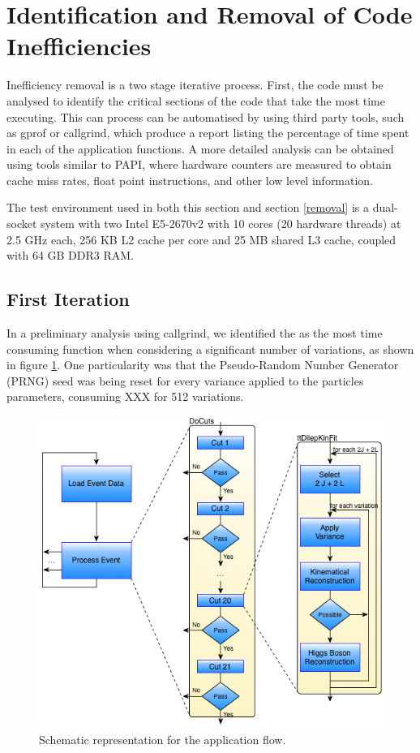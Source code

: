 \section{Identification and Removal of Code Inefficiencies}
\label{identification}

Inefficiency removal is a two stage iterative process. First, the code must be analysed to identify the critical sections of the code that take the most time executing. This can process can be automatised by using third party tools, such as gprof or callgrind, which produce a report listing the percentage of time spent in each of the application functions. A more detailed analysis can be obtained using tools similar to PAPI, where hardware counters are measured to obtain cache miss rates, float point instructions, and other low level information.

The test environment used in both this section and section \ref{removal} is a dual-socket system with two Intel E5-2670v2 with 10 cores (20 hardware threads) at 2.5 GHz each, 256 KB L2 cache per core and 25 MB shared L3 cache, coupled with 64 GB DDR3 RAM.

\subsection{First Iteration}

In a preliminary analysis using callgrind, we identified the \ttDilepKinFit as the most time consuming function when considering a significant number of variations, as shown in figure \ref{fig:ttDilepKinFit}. One particularity was that the Pseudo-Random Number Generator (PRNG) seed was being reset for every variance applied to the particles parameters, consuming XXX for 512 variations.

\begin{figure}[!htp]
	\begin{center}
		\includegraphics[scale=0.4]{images/graf_abstract_flow_with_kinfit.png}
		\caption{Schematic representation for the \tth application flow.}
		\label{fig:ttDilepKinFit}
	\end{center}
\end{figure}

